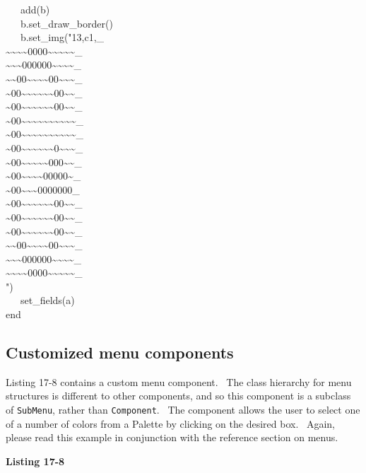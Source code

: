 {\>   \ \ \ add(b) \\
\>   \ \ \ b.set\_draw\_border() \\
\>   \ \ \ b.set\_img("13,c1,\_ \\
\~{}\~{}\~{}\~{}0000\~{}\~{}\~{}\~{}\~{}\_ \\
\~{}\~{}\~{}000000\~{}\~{}\~{}\~{}\_ \\
\~{}\~{}00\~{}\~{}\~{}\~{}00\~{}\~{}\~{}\_ \\
\~{}00\~{}\~{}\~{}\~{}\~{}\~{}00\~{}\~{}\_ \\
\~{}00\~{}\~{}\~{}\~{}\~{}\~{}00\~{}\~{}\_ \\
\~{}00\~{}\~{}\~{}\~{}\~{}\~{}\~{}\~{}\~{}\~{}\_ \\
\~{}00\~{}\~{}\~{}\~{}\~{}\~{}\~{}\~{}\~{}\~{}\_ \\
\~{}00\~{}\~{}\~{}\~{}\~{}\~{}0\~{}\~{}\~{}\_ \\
\~{}00\~{}\~{}\~{}\~{}\~{}000\~{}\~{}\_ \\
\~{}00\~{}\~{}\~{}\~{}00000\~{}\_ \\
\~{}00\~{}\~{}\~{}0000000\_ \\
\~{}00\~{}\~{}\~{}\~{}\~{}\~{}00\~{}\~{}\_ \\
\~{}00\~{}\~{}\~{}\~{}\~{}\~{}00\~{}\~{}\_ \\
\~{}00\~{}\~{}\~{}\~{}\~{}\~{}00\~{}\~{}\_ \\
\~{}\~{}00\~{}\~{}\~{}\~{}00\~{}\~{}\~{}\_ \\
\~{}\~{}\~{}000000\~{}\~{}\~{}\~{}\_ \\
\~{}\~{}\~{}\~{}0000\~{}\~{}\~{}\~{}\~{}\_ \\
") \\
\>   \ \ \ set\_fields(a) \\
end
}

\subsection{Customized menu components}

Listing 17-8 contains a custom menu component. \ The class hierarchy for
menu structures is different to other components, and so this component
is a subclass of \texttt{SubMenu}, rather than
\texttt{Component}. \ The component allows the user to select one of a
number of colors from a Palette by clicking on the desired box.
\ Again, please read this example in conjunction with the reference
section on menus.

\bigskip

{\sffamily\bfseries
Listing 17-8}

